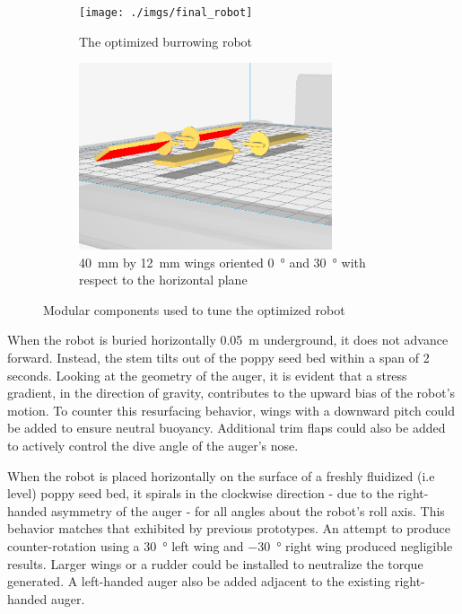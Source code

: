 \documentclass[letterpaper, 11 pt]{article}
\begin{document}
\begin{figure}[H]
\centering
\begin{subfigure}{.5\textwidth}
	\centering
	\texttt{[image: ./imgs/final\_robot]}
	\caption{The optimized burrowing robot}
	\label{fig:final_robot}
\end{subfigure}%
\begin{subfigure}{.5\textwidth}
	\centering
	\includegraphics[height=5.5cm]{./imgs/wings}
	\caption{\SI{40}{\milli\m} by \SI{12}{\milli\m} wings oriented \SI{0}{\degree} and \SI{30}{\degree} with respect to the horizontal plane}
	\label{fig:wings}
\end{subfigure}
\caption{Modular components used to tune the optimized robot}
\label{fig:final_testing}
\end{figure} 

When the robot is buried horizontally \SI{0.05}{\m} underground, it does not advance forward. Instead, the stem tilts out of the poppy seed bed within a span of 2 seconds. Looking at the geometry of the auger, it is evident that a stress gradient, in the direction of gravity, contributes to the upward bias of the robot's motion. To counter this resurfacing behavior, wings with a downward pitch could be added to ensure neutral buoyancy. Additional trim flaps could also be added to actively control the dive angle of the auger's nose. 
 
When the robot is placed horizontally on the surface of a freshly fluidized (i.e level) poppy seed bed, it spirals in the clockwise direction - due to the right-handed asymmetry of the auger - for all angles about the robot's roll axis. This behavior matches that exhibited by previous prototypes. An attempt to produce counter-rotation using a \SI{30}{\degree} left wing  and \SI{-30}{\degree} right wing produced negligible results. Larger wings or a rudder could be installed to neutralize the torque generated. A left-handed auger also be added adjacent to the existing right-handed auger. 
 
\end{document}
